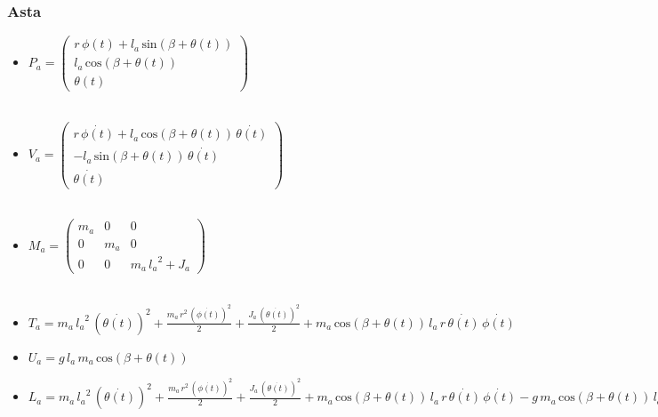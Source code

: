 \subsubsection{Asta}
\begin{itemize}
	
	\item \textbf{$P_a = \left(\begin{array}{c}
		r\,\phi \left(t\right)+l_a \,\mathrm{sin}\left(\beta +\theta \left(t\right)\right)\\
		l_a \,\mathrm{cos}\left(\beta +\theta \left(t\right)\right)\\
		\theta \left(t\right)
		\end{array}\right)$}
	\\\\
	\item \textbf{$V_a = \left(\begin{array}{c}
		r\,\dot{\phi \left(t\right)}+l_a \,\mathrm{cos}\left(\beta +\theta \left(t\right)\right)\,\dot{\theta \left(t\right)}\\
		-l_a \,\mathrm{sin}\left(\beta +\theta \left(t\right)\right)\,\dot{\theta \left(t\right)}\\
		\dot{\theta \left(t\right)}
		\end{array}\right)$}
	\\\\
	\item \textbf{$M_a = \left(\begin{array}{ccc}
		m_a  & 0 & 0\\
		0 & m_a  & 0\\
		0 & 0 & m_a \,{l_a }^2 +J_a 
		\end{array}\right)$}
	\\\\
	\item \textbf{$T_a = m_a \,{l_a }^2 \,{{\left(\dot{\theta \left(t\right)}\right)}}^2 +\frac{m_a \,r^2 \,{{\left(\dot{\phi \left(t\right)}\right)}}^2 }{2}+\frac{J_a \,{{\left(\dot{\theta \left(t\right)}\right)}}^2 }{2}+m_a \,\mathrm{cos}\left(\beta +\theta \left(t\right)\right)\,l_a \,r\,\dot{\theta \left(t\right)}\,\dot{\phi \left(t\right)}$}
	\\
	\item \textbf{$U_a = g\,l_a \,m_a \,\mathrm{cos}\left(\beta +\theta \left(t\right)\right)$}
	\\
	\item \textbf{$L_a = m_a \,{l_a }^2 \,{{\left(\dot{\theta \left(t\right)}\right)}}^2 +\frac{m_a \,r^2 \,{{\left(\dot{\phi \left(t\right)}\right)}}^2 }{2}+\frac{J_a \,{{\left(\dot{\theta \left(t\right)}\right)}}^2 }{2}+m_a \,\mathrm{cos}\left(\beta +\theta \left(t\right)\right)\,l_a \,r\,\dot{\theta \left(t\right)}\,\dot{\phi \left(t\right)}-g\,m_a \,\mathrm{cos}\left(\beta +\theta \left(t\right)\right)\,l_a$}
\end{itemize}

